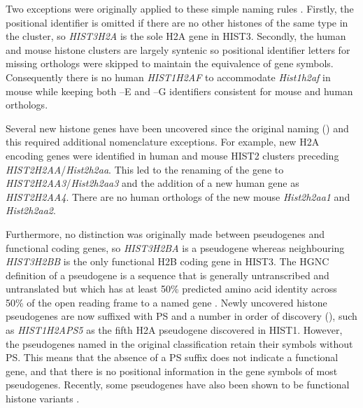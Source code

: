     Two exceptions were originally applied to these simple naming rules \citep{Marzluff02}.
    Firstly, the positional identifier is omitted if there are no
    other histones of the same type in the cluster,
    so \textit{HIST3H2A} is the sole H2A gene in HIST3.
    Secondly, the human and mouse histone clusters are largely syntenic
    so positional identifier letters for missing orthologs were skipped
    to maintain the equivalence of gene symbols.
    Consequently there is no human \textit{HIST1H2AF} to accommodate
    \textit{Hist1h2af} in mouse while keeping both --E and --G identifiers
    consistent for mouse and human orthologs.

    Several new histone genes have been uncovered since the original
    naming ()
    and this required additional nomenclature exceptions.
    For example, new H2A encoding genes were identified in human
    and mouse HIST2 clusters preceding \textit{HIST2H2AA}/\textit{Hist2h2aa}.
    This led to the renaming of the gene to \textit{HIST2H2AA3}/\textit{Hist2h2aa3}
    and the addition of a new human gene as \textit{HIST2H2AA4}.
    There are no human orthologs of the new mouse \textit{Hist2h2aa1} and \textit{Hist2h2aa2}.

    Furthermore, no distinction was originally made between
    pseudogenes and functional coding genes,
    so \textit{HIST3H2BA} is a pseudogene whereas neighbouring
    \textit{HIST3H2BB} is the only functional H2B coding gene in HIST3.
    The HGNC definition of a pseudogene is
    a sequence that is generally untranscribed and untranslated
    but which has at least 50\% predicted amino acid identity
    across 50\% of the open reading frame to a named gene \citep{HGNC2013}.
    Newly uncovered histone pseudogenes are now suffixed with PS and a
    number in order of discovery (),
    such as \textit{HIST1H2APS5} as the fifth H2A pseudogene discovered in HIST1.
    However, the pseudogenes named in the original classification retain their symbols without PS.
    This means that the absence of a PS suffix does not indicate a functional gene,
    and that there is no positional information in the gene symbols of most pseudogenes.
    Recently, some pseudogenes have also been shown to be functional histone variants \citep{TaguchiKurumizaka2017}.

